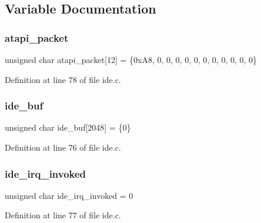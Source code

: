 \subsection{Variable Documentation}
\mbox{\label{a00032_a02351861ecf3191d5dbbcc1910b7c109_a02351861ecf3191d5dbbcc1910b7c109}} 
\subsubsection{\texorpdfstring{atapi\+\_\+packet}{atapi\_packet}}
{\footnotesize\ttfamily unsigned char atapi\+\_\+packet\mbox{[}12\mbox{]} = \{0x\+A8, 0, 0, 0, 0, 0, 0, 0, 0, 0, 0, 0\}\hspace{0.3cm}{\ttfamily [static]}}



Definition at line 78 of file ide.\+c.

\mbox{\label{a00032_a94f78e77f368421e4fe8faea979d523f_a94f78e77f368421e4fe8faea979d523f}} 
\subsubsection{\texorpdfstring{ide\+\_\+buf}{ide\_buf}}
{\footnotesize\ttfamily unsigned char ide\+\_\+buf\mbox{[}2048\mbox{]} = \{0\}}



Definition at line 76 of file ide.\+c.

\mbox{\label{a00032_a12985ec2f925d0cdbd7d24728b9849f9_a12985ec2f925d0cdbd7d24728b9849f9}} 
\subsubsection{\texorpdfstring{ide\+\_\+irq\+\_\+invoked}{ide\_irq\_invoked}}
{\footnotesize\ttfamily unsigned char ide\+\_\+irq\+\_\+invoked = 0\hspace{0.3cm}{\ttfamily [static]}}



Definition at line 77 of file ide.\+c.


